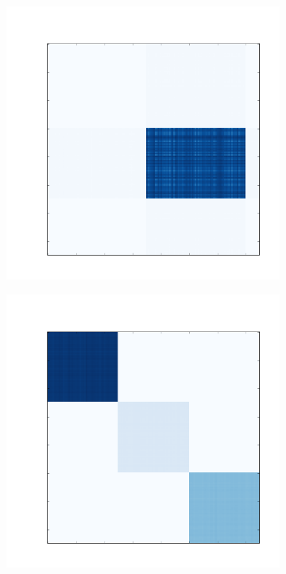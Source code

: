 \documentclass[
    12pt,                %
    oneside,            %
    a4paper,            %
    english,            %
    brazil                %
    ]{abntex2ppgsi}
\begin{document}
\begin{figure}[H]
    \begin{subfigure}[b]{0.18\textwidth}
        \includegraphics[width=\textwidth]{img/a-reconstruction-onmtf.png}
        \caption{}
    \end{subfigure}
    \begin{subfigure}[b]{0.18\textwidth}
        \includegraphics[width=\textwidth]{img/b-reconstruction-onmtf.png}

\end{subfigure}
\end{figure}
\end{document}
